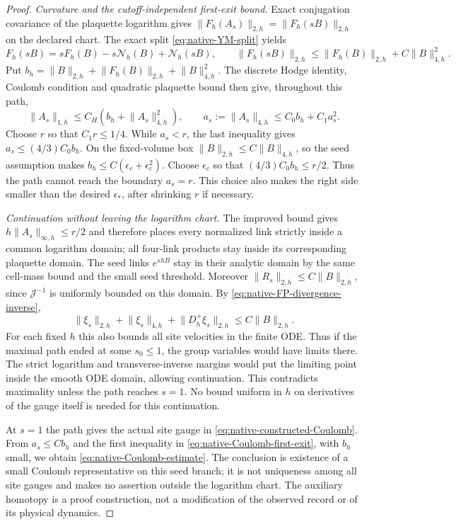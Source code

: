 \documentclass[11pt]{article}
\numberwithin{equation}{section}
\theoremstyle{definition}
\theoremstyle{remark}
\newcommand{\norm}[1]{\lVert#1\rVert}
\begin{document}
\begin{proof}
\emph{Curvature and the cutoff-independent first-exit bound.}
Exact conjugation covariance of the plaquette logarithm gives
$\norm{F_h(A_s)}_{2,h}=\norm{F_h(sB)}_{2,h}$ on the declared chart.
The exact split \eqref{eq:native-YM-split} yields
\[
 F_h(sB)=sF_h(B)-s\mathcal N_h(B)+\mathcal N_h(sB),
 \qquad
 \norm{F_h(sB)}_{2,h}
 \le\norm{F_h(B)}_{2,h}+C\norm B_{4,h}^2.
\]
Put $b_h=\norm B_{2,h}+\norm{F_h(B)}_{2,h}+\norm B_{4,h}^2$.
The discrete Hodge identity, Coulomb condition and quadratic plaquette bound
then give, throughout this path,
\begin{equation}
 \norm{A_s}_{1,h}\le C_H(b_h+\norm{A_s}_{4,h}^2),\qquad
 a_s:=\norm{A_s}_{4,h}\le C_0b_h+C_1a_s^2.
 \label{eq:native-Coulomb-first-exit}
\end{equation}
Choose $r$ so that $C_1r\le1/4$. While $a_s<r$, the last inequality gives
$a_s\le(4/3)C_0b_h$. On the fixed-volume box
$\norm B_{2,h}\le C\norm B_{4,h}$, so the seed assumption makes
$b_h\le C(\epsilon_c+\epsilon_c^2)$. Choose $\epsilon_c$ so that
$(4/3)C_0b_h\le r/2$. Thus the path cannot reach the boundary $a_s=r$.
This choice also makes the right side smaller than the desired
$\epsilon_*$, after shrinking $r$ if necessary.

\emph{Continuation without leaving the logarithm chart.}
The improved bound gives $h\norm{A_s}_{\infty,h}\le r/2$ and therefore
places every normalized link strictly inside a common logarithm domain;
all four-link products stay inside its corresponding plaquette domain.
The seed links $e^{shB}$ stay in their analytic domain by the same cell-mass
bound and the small seed threshold. Moreover
$\norm{R_s}_{2,h}\le C\norm B_{2,h}$, since $\mathcal J^{-1}$ is uniformly
bounded on this domain. By \eqref{eq:native-FP-divergence-inverse},
\begin{equation}
 \norm{\xi_s}_{2,h}+\norm{\xi_s}_{4,h}
       +\norm{D_h^+\xi_s}_{2,h}\le C\norm B_{2,h}.
 \label{eq:native-Coulomb-generator-control}
\end{equation}
For each fixed $h$ this also bounds all site velocities in the finite ODE.
Thus if the maximal path ended at some $s_0\le1$, the group variables would
have limits there. The strict logarithm and transverse-inverse margins would
put the limiting point inside the smooth ODE domain, allowing continuation.
This contradicts maximality unless the path reaches $s=1$. No bound uniform
in $h$ on derivatives of the gauge itself is needed for this continuation.

At $s=1$ the path gives the actual site gauge in
\eqref{eq:native-constructed-Coulomb}. From $a_s\le Cb_h$ and the first
inequality in \eqref{eq:native-Coulomb-first-exit}, with $b_h$ small, we obtain
\eqref{eq:native-Coulomb-estimate}. The conclusion is existence of a small
Coulomb representative on this seed branch; it is not uniqueness among all
site gauges and makes no assertion outside the logarithm chart. The auxiliary
homotopy is a proof construction, not a modification of the observed record
or of its physical dynamics.
\end{proof}
\end{document}
